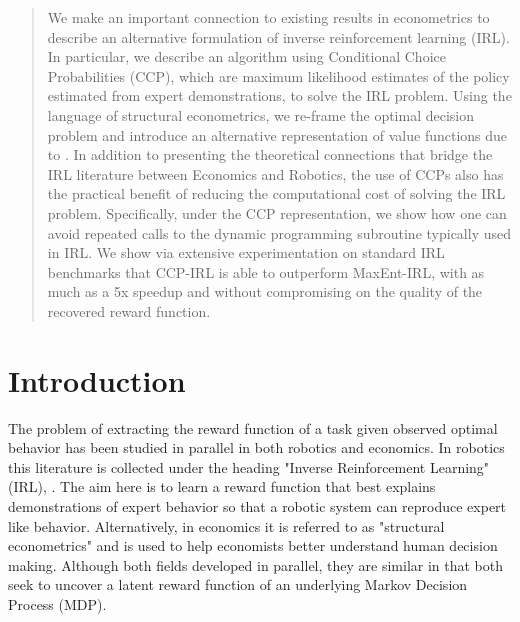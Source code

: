 \documentclass{article}
\begin{document}
\begin{abstract}
We make an important connection to existing results in econometrics to describe an alternative formulation of inverse reinforcement learning (IRL). In particular, we describe an algorithm using Conditional Choice Probabilities (CCP), which are maximum likelihood estimates of the policy estimated from expert demonstrations, to solve the IRL problem. Using the language of structural econometrics, we re-frame the optimal decision problem and introduce an alternative representation of value functions due to \cite{hotz}. In addition to presenting the theoretical connections that bridge the IRL literature between Economics and Robotics, the use of CCPs also has the practical benefit of reducing the computational cost of solving the IRL problem. Specifically, under the CCP representation, we show how one can avoid repeated calls to the dynamic programming subroutine typically used in IRL. 
We show via extensive experimentation on standard IRL benchmarks that CCP-IRL is able to outperform MaxEnt-IRL, with as much as a 5x speedup and without compromising on the quality of the recovered reward function.

\end{abstract} 

\section{Introduction}

The problem of extracting the reward function of a task given observed optimal behavior has been studied in parallel in both robotics and economics. In robotics this literature is collected under the heading "Inverse Reinforcement Learning" (IRL), \cite{Ng2000, abbeel2004apprenticeship}. The aim here is to learn a reward function that best explains demonstrations of expert behavior so that a robotic system can reproduce expert like behavior. Alternatively, in economics it is referred to as "structural econometrics" \cite{miller, pakes, rust_gmc} and is used to help economists better understand human decision making. 
Although both fields developed in parallel, they are similar in that both seek to uncover a latent reward function of an underlying Markov Decision Process (MDP).
\end{document}
